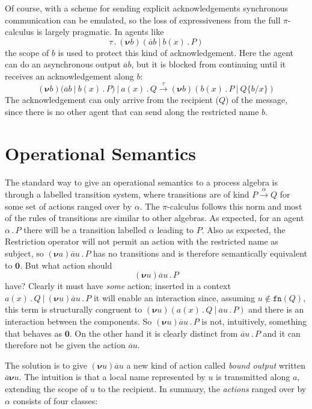 \documentclass[10pt,a4paper]{article}
\newcommand{\resp}[1]{(\boldsymbol{\nu}#1)}
\newcommand{\res}[2]{\resp{#1}#2}
\newcommand{\nil}{\mathbf{0}}
\newcommand{\outp}[2]{\overline{#1}#2}
\newcommand{\inpp}[2]{#1(#2)}
\newcommand{\silp}{\tau}
\newcommand{\prefix}[2]{{#1}\,.\,#2}
\newcommand{\boutp}[2]{\overline{#1}\boldsymbol{\nu}#2}
\newcommand{\out}[3]{\prefix{\outp{#1}{#2}}{#3}}
\newcommand{\inp}[3]{\prefix{\inpp{#1}{#2}}{#3}}
\newcommand{\sil}[1]{\prefix{\silp}{#1}}
\newcommand{\para}{\:|\:}
\newcommand{\fn}{\texttt{fn}}
\newcommand{\tran}[3]{#1 \overset{#2}{\longrightarrow} #3}
\begin{document}
Of course, with a scheme for sending explicit acknowledgements synchronous communication can be emulated, so the loss of expressiveness from the full $\pi$-calculus is largely pragmatic. In agents like
\[
\sil{\res{b}{(\outp{a}{b} \para \inp{b}{x}{P})}}
\]
the scope of $b$ is used to protect this kind of acknowledgement. Here the agent can do an asynchronous output $\outp{a}{b}$, but it is blocked from continuing until it receives an acknowledgement along $b$:
\[
\tran{\res{b}{(\outp{a}{b} \para \inp{b}{x}{P})} \para \inp{a}{x}{Q}}{\silp}{\res{b}{(\inp{b}{x}{P} \para Q\{b/x\})}}
\]
The acknowledgement can only arrive from the recipient ($Q$) of the message, since there is no other agent that can send along the restricted name $b$.

\section{Operational Semantics}

The standard way to give an operational semantics to a process algebra is through a labelled transition system, where transitions are of kind $\tran{P}{\alpha}{Q}$ for some set of actions ranged over by $\alpha$. The $\pi$-calculus follows this norm and most of the rules of transitions are similar to other algebras. As expected, for an agent $\prefix{\alpha}{P}$ there will be a transition labelled $\alpha$ leading to $P$. Also as expected, the Restriction operator will not permit an action with the restricted name as subject, so $\res{a}{\out{a}{u}{P}}$ has no transitions and is therefore semantically equivalent to $\nil$. But what action should 
\[
\res{u}{\out{a}{u}{P}}
\]
have? Clearly it must have \emph{some} action; inserted in a context $\inp{a}{x}{Q} \para \res{u}{\out{a}{u}{P}}$ it will enable an interaction since, assuming $u \notin \fn(Q)$, this term is structurally congruent to $\res{u}{(\inp{a}{x}{Q} \para \out{a}{u}{P})}$ and there is an interaction between the components. So $\res{u}{\out{a}{u}{P}}$ is not, intuitively, something that behaves as $\nil$. On the other hand it is clearly distinct from $\out{a}{u}{P}$ and it can therefore not be given the action $\outp{a}{u}$. 

The solution is to give $\res{u}{\outp{a}{u}}$ a new kind of action called \emph{bound output} written $\boutp{a}{u}$. The intuition is that a local name represented by $u$ is transmitted along $a$, extending the scope of $u$ to the recipient. In summary, the \emph{actions} ranged over by $\alpha$ consists of four classes:
\end{document}
